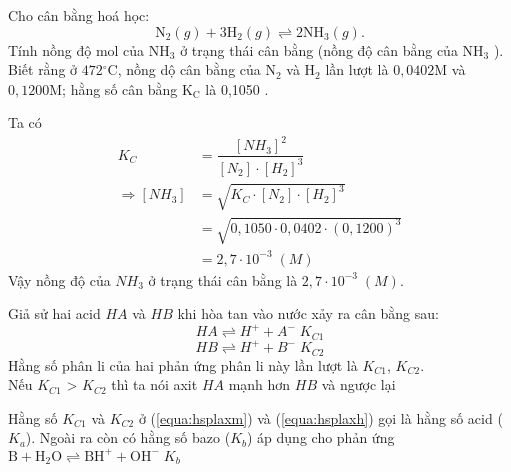 	\begin{vidu}
		Cho cân bằng hoá học:
		\[\mathrm{N}_2(g)+3 \mathrm{H}_2(g) \rightleftharpoons 2 \mathrm{NH}_3(g) .\]
		Tính nồng độ mol của $\mathrm{NH}_3$ ở trạng thái cân bằng (nồng độ cân bằng của $\mathrm{NH}_3$ ). Biết rằng ở $472{ }^{\circ} \mathrm{C}$, nồng dộ cân bằng của $\mathrm{N}_2$ và $\mathrm{H}_2$ lần lượt là $0,0402 \mathrm{M}$ và $0,1200 \mathrm{M}$; hằng số cân bằng $\mathrm{K}_{\mathrm{C}}$ là 0,1050 .
		\begin{center}
		\end{center}
		Ta có
		\begin{align*}
			K_C&=\dfrac{[NH_3]^2}{[N_2]\cdot[H_2]^3}\\
			\Rightarrow [NH_3] &=\sqrt{K_C\cdot[N_2]\cdot[H_2]^3}\\
			 &=\sqrt{0{,}1050\cdot0{,}0402\cdot(0{,}1200)^3}\\
			 &=2{,}7\cdot10^{-3}\;(M)
		\end{align*}
		Vậy nồng độ của $NH_3$ ở trạng thái cân bằng là $2{,}7\cdot10^{-3}\;(M)$.
	\end{vidu}
\begin{paracol}{2}
	\noindent Giả sử hai acid $HA$ và $HB$ khi hòa tan vào nước xảy ra cân bằng sau:
	\begin{equation}
		H A \rightleftharpoons H^{+}+A^{-} \; K_{C1} \label{equa:hsplaxm}
	\end{equation}
	\begin{equation}
		H B \rightleftharpoons H^{+}+B^{-} \; K_{C2} \label{equa:hsplaxh}
	\end{equation}
	Hằng số phân li của hai phản ứng phân li này lần lượt là $K_{C1}$, $K_{C2}$.
	\\
	Nếu $K_{C1}$ > $K_{C2}$ thì ta nói axit $HA$ mạnh hơn $HB$ và ngược lại
	\switchcolumn
	\begin{Bancobiet}
		Hằng số $K_{C1}$ và $K_{C2}$ ở (\ref{equa:hsplaxm}) và (\ref{equa:hsplaxh}) gọi là hằng số acid ($K_a$).
		Ngoài ra còn có hằng số bazo ($K_b$) áp dụng cho phản ứng\\
		$\mathrm{B}+\mathrm{H}_2 \mathrm{O} \rightleftharpoons \mathrm{BH}^{+}+\mathrm{OH}^{-}\; K_b$
	\end{Bancobiet}
\end{paracol}
